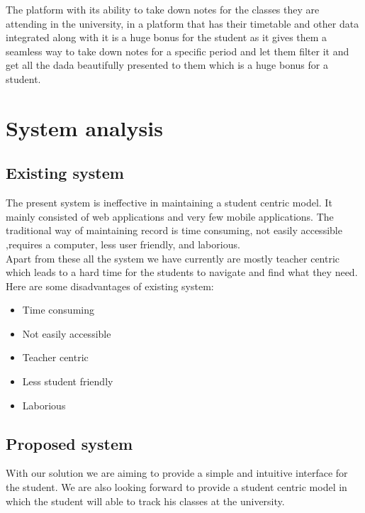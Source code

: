 \documentclass{article}
\begin{document}
\vspace{1em}
\Large
The platform with its ability to take down notes for the classes they are attending in the university, in a platform that has their timetable and other data integrated along with it is a huge bonus for the student as it gives them a seamless way to take down notes for a specific period and let them filter it and get all the dada beautifully presented to them which is a huge bonus for a student.

\newpage



\section{System analysis}
\hspace{1em}

\subsection{Existing system}

\Large
The present system is ineffective in maintaining a student centric model. It mainly consisted of web applications and very few mobile applications. The traditional way of maintaining record is time consuming, not easily accessible ,requires a computer, less user friendly, and laborious.\\

\Large
Apart from these all the system we have currently are mostly teacher centric which leads to a hard time for the students to navigate and find what they need.\\

\Large
Here are some disadvantages of existing system:
\begin{itemize}
\item Time consuming
\item Not easily accessible
\item Teacher centric
\item Less student friendly
\item Laborious
\end{itemize}

\vspace{1em}

\subsection{Proposed system}

\Large
With our solution we are aiming to provide a simple and intuitive interface for the student. We are also looking forward to provide a student centric model in which the student will able to track his classes at the university.\\
\end{document}
